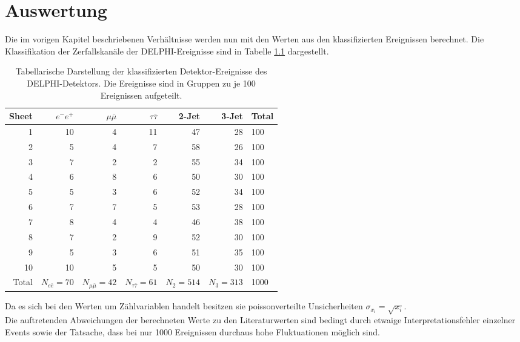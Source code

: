 \documentclass{include/thesisclass3}
\begin{document}
\chapter{Auswertung}
Die im vorigen Kapitel beschriebenen Verhältnisse werden nun mit den Werten aus den klassifizierten Ereignissen berechnet. Die Klassifikation der Zerfallskanäle der DELPHI-Ereignisse sind in Tabelle \ref{rohdaten} dargestellt.
\begin{table}[H]
\begin{center}
\begin{tabular}{   r | r| r | r | r | r | l   }
	Sheet & $e^-e^+$ & $\mu\bar{\mu}$ & $\tau\bar{\tau}$ & 2-Jet & 3-Jet & Total \\\hline
	1 & 10 & 4 & 11 & 47 & 28 & 100 \\ 
	2 & 5 & 4 & 7 & 58 & 26 & 100 \\ 
	3 & 7 & 2 & 2 & 55 & 34 & 100 \\ 
	4 & 6 & 8 & 6 & 50 & 30 & 100 \\ 
	5 & 5 & 3 & 6 & 52 & 34 & 100 \\ 
	6 & 7 & 7 & 5 & 53 & 28 & 100 \\ 
	7 & 8 & 4 & 4 & 46 & 38 & 100 \\ 
	8 & 7 & 2 & 9 & 52 & 30 & 100 \\ 
	9 & 5 & 3 & 6 & 51 & 35 & 100 \\ 
	10 & 10 & 5 & 5 & 50 & 30 & 100 \\ \hline
	Total &$N_{e \bar e} = 70$ & $N_{\mu \bar \mu} = 42$ &$N_{\tau \bar \tau} = 61$ & $N_2 = 514$ & $N_ 3 = 313$ & 1000
	\label{rohdaten}
\end{tabular}
\end{center}
\caption{Tabellarische Darstellung der klassifizierten Detektor-Ereignisse des DELPHI-Detektors. Die Ereignisse sind in Gruppen zu je 100 Ereignissen aufgeteilt.}
\end{table}
Da es sich bei den Werten um Zählvariablen handelt besitzen sie poissonverteilte Unsicherheiten $\sigma_{x_i}=\sqrt{x_i}$.\\
Die auftretenden Abweichungen der berechneten Werte zu den Literaturwerten sind bedingt durch etwaige Interpretationsfehler einzelner Events sowie der Tatsache, dass bei nur 1000 Ereignissen durchaus hohe Fluktuationen möglich sind.
\end{document}
